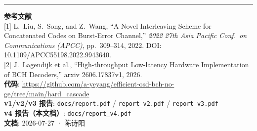 \documentclass[11pt,a4paper]{article}
\begin{document}
\vspace{6pt}
\hrule
\vspace{4pt}
\noindent\footnotesize{
\textbf{参考文献}\\
{[1]} L.\ Liu, S.\ Song, and Z.\ Wang, ``A Novel Interleaving Scheme for Concatenated Codes on
Burst-Error Channel,'' \emph{2022 27th Asia Pacific Conf.\ on Communications (APCC)}, pp.\ 309--314,
2022. DOI: 10.1109/APCC55198.2022.9943640.\\
{[2]} J.\ Lagendijk et al., ``High-throughput Low-latency Hardware Implementation of BCH Decoders,''
arxiv 2606.17837v1, 2026.\\
\textbf{代码}: \url{https://github.com/a-yeyang/efficient-osd-bch-no-ge/tree/main/hard_cascade}\\
\textbf{v1/v2/v3 报告}: \texttt{docs/report.pdf} / \texttt{report\_v2.pdf} / \texttt{report\_v3.pdf}\\
\textbf{v4 报告（本文档）}: \texttt{docs/report\_v4.pdf}\\
\textbf{文档}: 2026-07-27 · 陈诗阳
}
\end{document}
